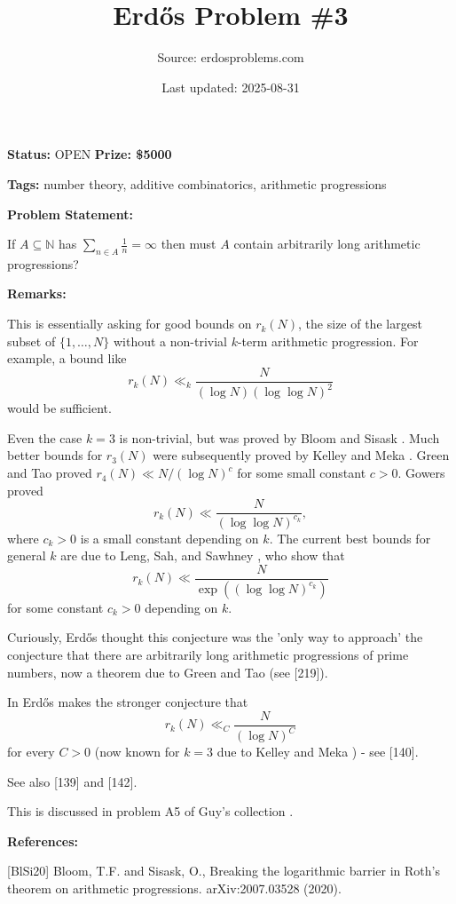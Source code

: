\documentclass{article}
\title{Erd\H{o}s Problem \#3}
\date{Last updated: 2025-08-31}
\author{Source: erdosproblems.com}
\begin{document}
\maketitle

\noindent\textbf{Status:} OPEN \quad \textbf{Prize: \$5000}

\noindent\textbf{Tags:} number theory, additive combinatorics, arithmetic progressions

\medskip
\noindent\textbf{Problem Statement:}

If $A\subseteq \mathbb{N}$ has $\sum_{n\in A}\frac{1}{n}=\infty$ then must $A$ contain arbitrarily long arithmetic progressions?

\bigskip
\noindent\textbf{Remarks:}

This is essentially asking for good bounds on $r_k(N)$, the size of the largest subset of $\{1,\ldots,N\}$ without a non-trivial $k$-term arithmetic progression. For example, a bound like\[r_k(N) \ll_k \frac{N}{(\log N)(\log\log N)^2}\]would be sufficient. 

Even the case $k=3$ is non-trivial, but was proved by Bloom and Sisask \cite{BlSi20}. Much better bounds for $r_3(N)$ were subsequently proved by Kelley and Meka \cite{KeMe23}. Green and Tao \cite{GrTa17} proved $r_4(N)\ll N/(\log N)^{c}$ for some small constant $c>0$. Gowers \cite{Go01} proved\[r_k(N) \ll \frac{N}{(\log\log N)^{c_k}},\]where $c_k>0$ is a small constant depending on $k$. The current best bounds for general $k$ are due to Leng, Sah, and Sawhney \cite{LSS24}, who show that\[r_k(N) \ll \frac{N}{\exp((\log\log N)^{c_k})}\]for some constant $c_k>0$ depending on $k$.

Curiously, Erd\H{o}s \cite{Er83c} thought this conjecture was the 'only way to approach' the conjecture that there are arbitrarily long arithmetic progressions of prime numbers, now a theorem due to Green and Tao \cite{GrTa08} (see [219]).

In \cite{Er81} Erd\H{o}s makes the stronger conjecture that\[r_k(N) \ll_C\frac{N}{(\log N)^C}\]for every $C>0$ (now known for $k=3$ due to Kelley and Meka \cite{KeMe23}) - see [140].

See also [139] and [142].

This is discussed in problem A5 of Guy's collection \cite{Gu04}.

\bigskip
\noindent\textbf{References:}

[BlSi20] Bloom, T.F. and Sisask, O., Breaking the logarithmic barrier in Roth's theorem on arithmetic progressions. arXiv:2007.03528 (2020).
 
\end{document}
